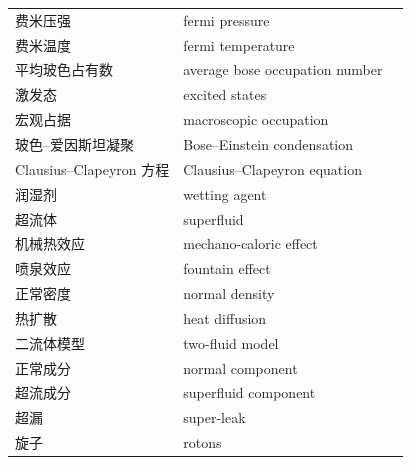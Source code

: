 \begin{xltabular}{\textwidth}{@{}l l c@{}}
  费米压强 & {\glossaryfont fermi pressure} & \pageref{term:7.fermi-pressure} \\
  费米温度 & {\glossaryfont fermi temperature} & \pageref{term:7.fermi-temperature} \\
  平均玻色占有数 & {\glossaryfont average bose occupation number} & \pageref{term:7.bose-occ-number} \\
  激发态 & {\glossaryfont excited states} & \pageref{term:7.excited-states} \\
  宏观占据 & {\glossaryfont macroscopic occupation} & \pageref{term:7.macroscopic-occupation} \\
  玻色--爱因斯坦凝聚 & {\glossaryfont Bose--Einstein condensation} & \pageref{term:7.bose-einstein-condensation} \\
  Clausius--Clapeyron 方程 & {\glossaryfont Clausius--Clapeyron equation} & \pageref{term:7.clausius-clapeyron} \\
  润湿剂 & {\glossaryfont wetting agent} & \pageref{term:7.wetting-agent} \\
  超流体 & {\glossaryfont superfluid} & \pageref{term:7.superfluid} \\
  机械热效应 & {\glossaryfont mechano-caloric effect} & \pageref{term:7.mechano-caloric} \\
  喷泉效应 & {\glossaryfont fountain effect} & \pageref{term:7.fountain-effect} \\
  正常密度 & {\glossaryfont normal density} & \pageref{term:7.normal-density} \\
  热扩散 & {\glossaryfont heat diffusion} & \pageref{term:7.heat-diffusion} \\
  二流体模型 & {\glossaryfont two-fluid model} & \pageref{term:7.two-fluid-model} \\
  正常成分 & {\glossaryfont normal component} & \pageref{term:7.normal-component} \\
  超流成分 & {\glossaryfont superfluid component} & \pageref{term:7.superfluid-component} \\
  超漏 & {\glossaryfont super-leak} & \pageref{term:7.super-leak} \\
  旋子 & {\glossaryfont rotons} & \pageref{term:7.rotons} \\
\end{xltabular}
